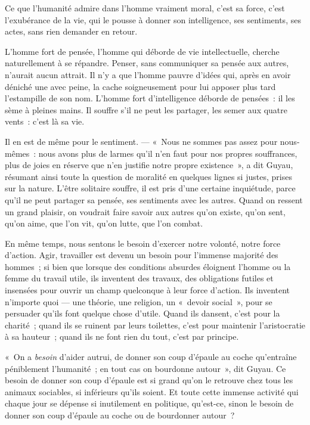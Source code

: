 \documentclass[french,twoside]{book} %
\begin{document}
\noindent Ce que l’humanité admire dans l’homme vraiment moral, c’est sa force, c’est l’exubérance de la vie, qui le pousse à donner son intelligence, ses sentiments, ses actes, sans rien demander en retour.\par
L’homme fort de pensée, l’homme qui déborde de vie intellectuelle, cherche naturellement à se répandre. Penser, sans communiquer sa pensée aux autres, n’aurait aucun attrait. Il n’y a que l’homme pauvre d’idées qui, après en avoir déniché une avec peine, la cache soigneusement pour lui apposer plus tard l’estampille de son nom. L’homme fort d’intelligence déborde de pensées : il les sème à pleines mains. Il souffre s’il ne peut les partager, les semer aux quatre vents : c’est là sa vie.\par
Il en est de même pour le sentiment. — « Nous ne sommes pas assez pour nous-mêmes : nous avons plus de larmes qu’il n’en faut pour nos propres souffrances, plus de joies en réserve que n’en justifie notre propre existence », a dit Guyau, résumant ainsi toute la question de moralité en quelques lignes si justes, prises sur la nature. L’être solitaire souffre, il est pris d’une certaine inquiétude, parce qu’il ne peut partager sa pensée, ses sentiments avec les autres. Quand on ressent un grand plaisir, on voudrait faire savoir aux autres qu’on existe, qu’on sent, qu’on aime, que l’on vit, qu’on lutte, que l’on combat.\par
\bigbreak
\noindent En même temps, nous sentons le besoin d’exercer notre volonté, notre force d’action. Agir, travailler est devenu un besoin pour l’immense majorité des hommes ; si bien que lorsque des conditions absurdes éloignent l’homme ou la femme du travail utile, ils inventent des travaux, des obligations futiles et insensées pour ouvrir un champ quelconque à leur force d’action. Ils inventent n’importe quoi — une théorie, une religion, un « devoir social », pour se persuader qu’ils font quelque chose d’utile. Quand ils dansent, c’est pour la charité ; quand ils se ruinent par leurs toilettes, c’est pour maintenir l’aristocratie à sa hauteur ; quand ils ne font rien du tout, c’est par principe.\par
« On a \emph{besoin} d’aider autrui, de donner son coup d’épaule au coche qu’entraîne péniblement l’humanité ; en tout cas on bourdonne autour », dit Guyau. Ce besoin de donner son coup d’épaule est si grand qu’on le retrouve chez tous les animaux sociables, si inférieurs qu’ils soient. Et toute cette immense activité qui chaque jour se dépense si inutilement  en politique, qu’est-ce, sinon le besoin de donner son coup d’épaule au coche ou de bourdonner autour ?\par
\end{document}
